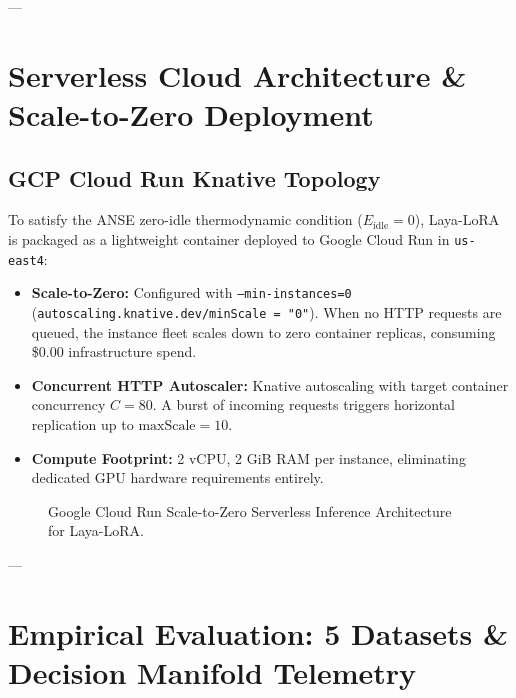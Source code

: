 \documentclass[10pt,journal,compsoc]{IEEEtran}
\theoremstyle{remark}
\begin{document}
---

\section{Serverless Cloud Architecture \& Scale-to-Zero Deployment}

\subsection{GCP Cloud Run Knative Topology}
To satisfy the ANSE zero-idle thermodynamic condition ($E_{\text{idle}} = 0$), Laya-LoRA is packaged as a lightweight container deployed to Google Cloud Run in \texttt{us-east4}:
\begin{itemize}
    \item \textbf{Scale-to-Zero:} Configured with \texttt{--min-instances=0} (\texttt{autoscaling.knative.dev/minScale = "0"}). When no HTTP requests are queued, the instance fleet scales down to zero container replicas, consuming \$0.00 infrastructure spend.
    \item \textbf{Concurrent HTTP Autoscaler:} Knative autoscaling with target container concurrency $C = 80$. A burst of incoming requests triggers horizontal replication up to $\text{maxScale} = 10$.
    \item \textbf{Compute Footprint:} 2 vCPU, 2 GiB RAM per instance, eliminating dedicated GPU hardware requirements entirely.
\end{itemize}

\begin{figure}[htbp]
\centering
{}
\caption{Google Cloud Run Scale-to-Zero Serverless Inference Architecture for Laya-LoRA.}
\label{fig:cloud_run_arch}
\end{figure}

---

\section{Empirical Evaluation: 5 Datasets \& Decision Manifold Telemetry}
\end{document}
